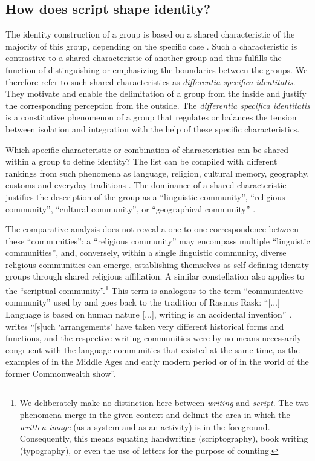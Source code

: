 \documentclass[output=paper,colorlinks,citecolor=brown,arabicfont,georgian]{langscibook}
\begin{document}
\subsection{How does script shape identity?}\label{3.8.ss.1.1}

The identity construction of a group is based on a shared characteristic of the majority of this group, depending on the specific case \citep[2--3]{phinney2000}. Such a characteristic is contrastive to a shared characteristic of another group and thus fulfills the function of distinguishing or emphasizing the boundaries between the groups. We therefore refer to such shared characteristics as \textit{differentia specifica identitatis}. They motivate and enable the delimitation of a group from the inside and justify the corresponding perception from the outside. The \textit{differentia specifica identitatis} is a constitutive phenomenon of a group that regulates or balances the tension between isolation and integration with the help of these specific characteristics.

Which specific characteristic or combination of characteristics can be shared within a group to define identity? The list can be compiled with different rankings from such phenomena as language, religion, cultural memory, geography, customs and everyday traditions \citep[5]{segerstedt1942}. The dominance of a shared characteristic justifies the description of the group as a ``linguistic community'', ``religious community'', ``cultural community'', or ``geographical community'' \citep[4]{zabrocki1970}. 

The comparative analysis does not reveal a one-to-one correspondence between these ``communities'': a ``religious community'' may encompass multiple ``linguistic communities'', and, conversely, within a single linguistic community, diverse religious communities can emerge, establishing themselves as self-defining identity groups through shared religious affiliation. A similar constellation also applies to the ``scriptual community''.\footnote{%
We deliberately make no distinction here between \textit{writing} and \textit{script}. The two phenomena merge in the given context and delimit the area in which the \textit{written image} (as a system and as an activity) is in the foreground. Consequently, this means equating handwriting (scriptography), book writing (typography), or even the use of letters for the purpose of counting.} This term is analogous to the term ``communicative community'' used by \citet{zabrocki1970} and goes back to the tradition of Rasmus Rask: ``[...] Language is based on human nature [...], writing is an accidental invention'' \citep{rask1826}. \citet[111--151]{glueck1987} writes ``[s]uch `arrangements' have taken very different historical forms and functions, and the respective writing communities were by no means necessarily congruent with the language communities that existed at the same time, as the examples of  in the Middle Ages and early modern period or of  in the world of the former Commonwealth show''. 
\end{document}
